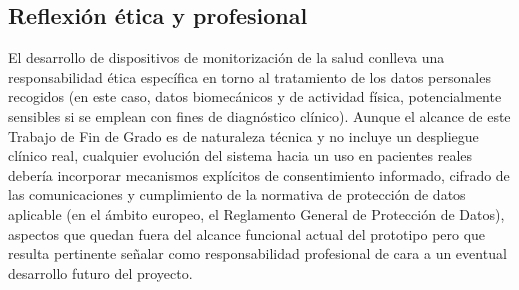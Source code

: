 \begin{IAtext}
\section{Reflexión ética y profesional}

El desarrollo de dispositivos de monitorización de la salud conlleva una responsabilidad ética específica en torno al tratamiento de los datos personales recogidos (en este caso, datos biomecánicos y de actividad física, potencialmente sensibles si se emplean con fines de diagnóstico clínico). Aunque el alcance de este Trabajo de Fin de Grado es de naturaleza técnica y no incluye un despliegue clínico real, cualquier evolución del sistema hacia un uso en pacientes reales debería incorporar mecanismos explícitos de consentimiento informado, cifrado de las comunicaciones y cumplimiento de la normativa de protección de datos aplicable (en el ámbito europeo, el Reglamento General de Protección de Datos), aspectos que quedan fuera del alcance funcional actual del prototipo pero que resulta pertinente señalar como responsabilidad profesional de cara a un eventual desarrollo futuro del proyecto.

\end{IAtext}
